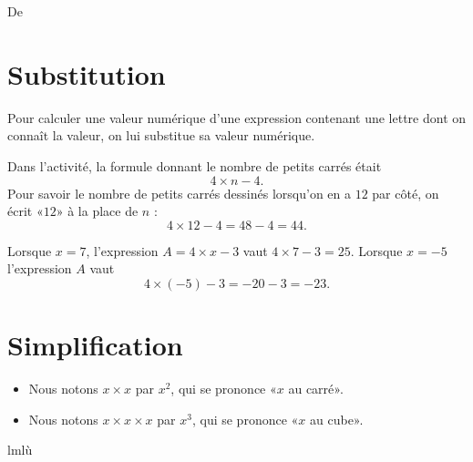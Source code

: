 

De \cite{NRHooXFvgpp4}

\section{Substitution}

\begin{Aretenir}
    Pour calculer une valeur numérique d'une expression contenant une lettre dont on connaît la valeur, on lui substitue sa valeur numérique.
\end{Aretenir}

\begin{example}
    Dans l'activité, la formule donnant le nombre de petits carrés était
    \begin{equation}
        4\times n-4.
    \end{equation}
    Pour savoir le nombre de petits carrés dessinés lorsqu'on en a \( 12\) par côté, on écrit «\( 12\)» à la place de \( n\) :
    \begin{equation}
        4\times 12-4=48-4=44.
    \end{equation}
\end{example}

\begin{example}
    Lorsque \( x=7\), l'expression \( A=4\times x-3\) vaut \( 4\times 7-3=25\). Lorsque \( x=-5\) l'expression \( A\) vaut
    \begin{equation}
        4\times (-5)-3=-20-3=-23.
    \end{equation}
\end{example}

\section{Simplification}

\begin{definition}
    \begin{itemize}
        \item 
    Nous notons \( x\times x\) par \( x^2\), qui se prononce «\( x\) au carré».
\item
    Nous notons \( x\times x\times x\) par \( x^3\), qui se prononce «\( x\) au cube».
    \end{itemize}
\end{definition}

lmlù
